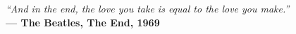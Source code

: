 
\renewcommand{\epigraphname}{EPÍGRAFE}

\begin{epigrafe}

    \textit{``And in the end, the love you take is equal to the love you make.''}\\
    \textbf{— The Beatles, The End, 1969}

\end{epigrafe}

